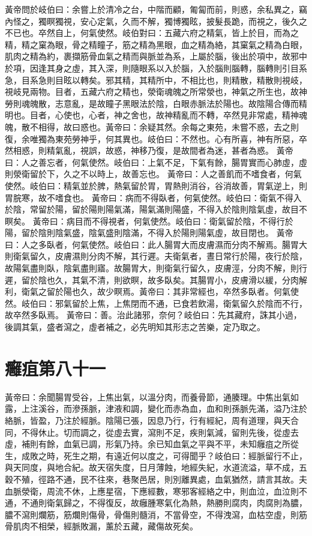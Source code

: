 黃帝問於岐伯曰：余嘗上於清冷之台，中階而顧，匍匐而前，則惑，余私異之，竊內怪之，獨瞑獨視，安心定氣，久而不解，獨博獨眩，披髮長跪，而視之，後久之不已也。卒然自上，何氣使然。岐伯對曰：五藏六府之精氣，皆上於目，而為之精，精之窠為眼，骨之精瞳子，筋之精為黑眼，血之精為絡，其窠氣之精為白眼，肌肉之精為約，裹擷筋骨血氣之精而與脈並為系，上屬於腦，後出於項中，故邪中於項，因逢其身之虛，其入深，則隨眼系以入於腦，入於腦則腦轉，腦轉則引目系急，目系急則目眩以轉矣。邪其精，其精所中，不相比也，則精散，精散則視岐，視岐見兩物。目者，五藏六府之精也，滎衛魂魄之所常滎也，神氣之所生也，故神勞則魂魄散，志意亂，是故瞳子黑眼法於陰，白眼赤脈法於陽也。故陰陽合傳而精明也。目者，心使也，心者，神之舍也，故神精亂而不轉，卒然見非常處，精神魂魄，散不相得，故曰惑也。黃帝曰：余疑其然。余每之東苑，未嘗不惑，去之則復，余唯獨為東苑勞神乎，何其異也。岐伯曰：不然也。心有所喜，神有所惡，卒然相惑，則精氣亂，視誤，故惑，神移乃復，是故間者為迷，甚者為惑。
黃帝曰：人之善忘者，何氣使然。岐伯曰：上氣不足，下氣有餘，腸胃實而心肺虛，虛則滎衛留於下，久之不以時上，故善忘也。
黃帝曰：人之善飢而不嗜食者，何氣使然。岐伯曰：精氣並於脾，熱氣留於胃，胃熱則消谷，谷消故善，胃氣逆上，則胃脘寒，故不嗜食也。
黃帝曰：病而不得臥者，何氣使然。岐伯曰：衛氣不得入於陰，常留於陽，留於陽則陽氣滿，陽氣滿則陽盛，不得入於陰則陰氣虛，故目不瞑矣。
黃帝曰：病目而不得視者，何氣使然。岐伯曰：衛氣留於陰，不得行於陽，留於陰則陰氣盛，陰氣盛則陰滿，不得入於陽則陽氣虛，故目閉也。
黃帝曰：人之多臥者，何氣使然。岐伯曰：此人腸胃大而皮膚濕而分肉不解焉。腸胃大則衛氣留久，皮膚濕則分肉不解，其行遲。夫衛氣者，晝日常行於陽，夜行於陰，故陽氣盡則臥，陰氣盡則寤。故腸胃大，則衛氣行留久，皮膚涇，分肉不解，則行遲，留於陰也久，其氣不清，則欲瞑，故多臥矣。其腸胃小，皮膚滑以緩，分肉解利，衛氣之留於陽也久，故少瞑焉。黃帝曰：其非常經也，卒然多臥者。何氣使然。岐伯曰：邪氣留於上焦，上焦閉而不通，已食若飲湯，衛氣留久於陰而不行，故卒然多臥焉。
黃帝曰：善。治此諸邪，奈何？岐伯曰：先其藏府，誅其小過，後調其氣，盛者瀉之，虛者補之，必先明知其形志之苦樂，定乃取之。

\section{癰疽第八十一}

黃帝曰：余聞腸胃受谷，上焦出氣，以溫分肉，而養骨節，通腠理。中焦出氣如露，上注溪谷，而滲孫脈，津液和調，變化而赤為血，血和則孫脈先滿，溢乃注於絡脈，皆盈，乃注於經脈。陰陽已張，因息乃行，行有經紀，周有道理，與天合同，不得休止。切而調之，從虛去實，瀉則不足，疾則氣減，留則先後，從虛去虛，補則有餘，血氣已調，形氣乃持。余已知血氣之平與不平，未知癰疽之所從生，成敗之時，死生之期，有遠近何以度之，可得聞乎？岐伯曰：經脈留行不止，與天同度，與地合紀。故天宿失度，日月薄蝕，地經失紀，水道流溢，草不成，五穀不殖，徑路不通，民不往來，巷聚邑居，則別離異處，血氣猶然，請言其故。夫血脈滎衛，周流不休，上應星宿，下應經數，寒邪客經絡之中，則血泣，血泣則不通，不通則衛氣歸之，不得復反，故癰腫寒氣化為熱，熱勝則腐肉，肉腐則為膿，膿不瀉則爛筋，筋爛則傷骨，骨傷則髓消，不當骨空，不得洩瀉，血枯空虛，則筋骨肌肉不相榮，經脈敗漏，薰於五藏，藏傷故死矣。

